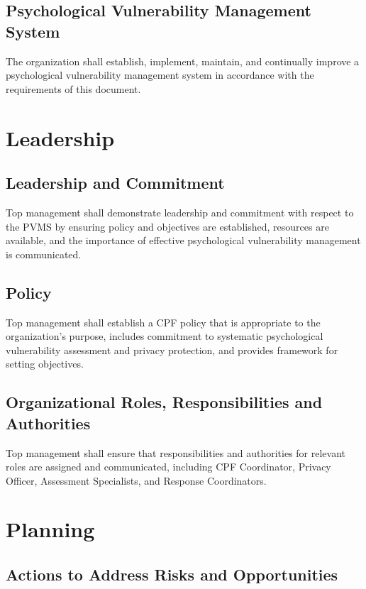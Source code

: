\documentclass[11pt,a4paper]{article}
\begin{document}
\subsection{Psychological Vulnerability Management System}

The organization shall establish, implement, maintain, and continually improve a psychological vulnerability management system in accordance with the requirements of this document.

\section{Leadership}

\subsection{Leadership and Commitment}

Top management shall demonstrate leadership and commitment with respect to the PVMS by ensuring policy and objectives are established, resources are available, and the importance of effective psychological vulnerability management is communicated.

\subsection{Policy}

Top management shall establish a CPF policy that is appropriate to the organization's purpose, includes commitment to systematic psychological vulnerability assessment and privacy protection, and provides framework for setting objectives.

\subsection{Organizational Roles, Responsibilities and Authorities}

Top management shall ensure that responsibilities and authorities for relevant roles are assigned and communicated, including CPF Coordinator, Privacy Officer, Assessment Specialists, and Response Coordinators.

\section{Planning}

\subsection{Actions to Address Risks and Opportunities}
\end{document}
